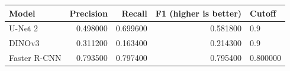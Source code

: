\begin{tabular}{lrrrl}
\toprule
Model & Precision & Recall & F1 (higher is better) & Cutoff \\
\midrule
U-Net 2 & 0.498000 & 0.699600 & 0.581800 & 0.9 \\
DINOv3 & 0.311200 & 0.163400 & 0.214300 & 0.9 \\
Faster R-CNN & 0.793500 & 0.797400 & 0.795400 & 0.800000 \\
\bottomrule
\end{tabular}
